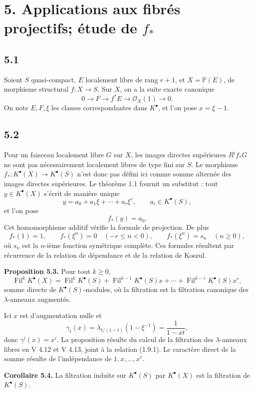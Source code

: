 \documentclass[11pt]{article}
\newcommand{\Fil}{\operatorname{Fil}}
\begin{document}
\section*{5. Applications aux fibrés projectifs; étude de \(f_*\)}

\subsection*{5.1}
Soient \(S\) quasi-compact, \(E\) localement libre de rang \(r+1\), et \(X=\mathbb P(E)\), de morphisme structural \(f:X\to S\). Sur \(X\), on a la suite exacte canonique
\[
  0\longrightarrow F\longrightarrow f^*E\longrightarrow \mathcal O_X(1)\longrightarrow 0.
\]
On note \(E,F,\xi\) les classes correspondantes dans \(K^\bullet\), et l'on pose \(x=\xi-1\).

\subsection*{5.2}
Pour un faisceau localement libre \(G\) sur \(X\), les images directes supérieures \(R^if_*G\) ne sont pas nécessairement localement libres de type fini sur \(S\). Le morphisme \(f_*:K^\bullet(X)\to K^\bullet(S)\) n'est donc pas défini ici comme somme alternée des images directes supérieures. Le théorème 1.1 fournit un substitut : tout \(y\in K^\bullet(X)\) s'écrit de manière unique
\[
  y=a_0+a_1\xi+\cdots+a_r\xi^r,
  \qquad a_i\in K^\bullet(S),
\]
et l'on pose
\[
  f_*(y)=a_0.
\]
Cet homomorphisme additif vérifie la formule de projection. De plus
\[
  f_*(1)=1,
  \qquad f_*(\xi^n)=0\quad(-r\le n<0),
  \qquad f_*(\xi^n)=s_n\quad(n\ge0),
\]
où \(s_n\) est la \(n\)-ième fonction symétrique complète. Ces formules résultent par récurrence de la relation de dépendance et de la relation de Koszul.

\textbf{Proposition 5.3.} Pour tout \(k\ge0\),
\[
  \Fil^kK^\bullet(X)=\Fil^kK^\bullet(S)+\Fil^{k-1}K^\bullet(S)x+\cdots+\Fil^{k-r}K^\bullet(S)x^r,
\]
somme directe de \(K^\bullet(S)\)-modules, où la filtration est la filtration canonique des \(\lambda\)-anneaux augmentés.

Ici \(x\) est d'augmentation nulle et
\[
  \gamma_t(x)=\lambda_{t/(1-t)}(1-\xi^{-1})=\frac{1}{1-xt},
\]
donc \(\gamma^i(x)=x^i\). La proposition résulte du calcul de la filtration des \(\lambda\)-anneaux libres en V 4.12 et V 4.13, joint à la relation (1.9.1). Le caractère direct de la somme résulte de l'indépendance de \(1,x,\ldots,x^r\).

\textbf{Corollaire 5.4.} La filtration induite sur \(K^\bullet(S)\) par \(K^\bullet(X)\) est la filtration de \(K^\bullet(S)\).
\end{document}
